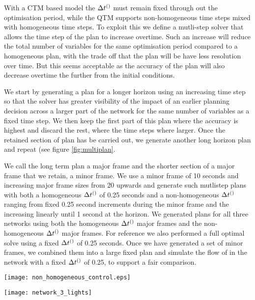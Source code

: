 With a CTM based model the $\DT[]$ must remain fixed through out the
optimisation period, while the QTM supports non-homogeneous time steps
mixed with homogeneous time steps. To exploit this we define a
mutli-step solver that allows the time step of the plan to increase
overtime. Such an increase will reduce the total number of variables
for the same optimisation period compared to a homogeneous plan, with
the trade off that the plan will be have less resolution over
time. But this seems acceptable as the accuracy of the plan will also
decrease overtime the further from the initial conditions.

We start by generating a plan for a longer horizon using an increasing
time step so that the solver has greater visibility of the impact of
an earlier planning decision across a larger part of the network for
the same number of variables as a fixed time step. We then keep the
first part of this plan where the accuracy is highest and discard the
rest, where the time steps where larger. Once the retained section of
plan has be carried out, we generate another long horizon plan and
repeat (see figure \ref{fig:multiplan}.

We call the long term plan a major frame and the shorter section of a
major frame that we retain, a minor frame. We use a minor frame of 10
seconds and increasing major frame sizes from 20 upwards and generate
such mutlistep plans with both a homogeneous $\DT[]$ of 0.25 seconds
and a non-homogeneous $\DT[]$ ranging from fixed 0.25 second increments
during the minor frame and the increasing linearly until 1 second at
the horizon. We generated plans for all three networks using both the
homogeneous $\DT[]$ major frames and the non-homogeneous $\DT[]$ major
frames. For reference we also performed a full optimal solve using a
fixed $\DT[]$ of 0.25 seconds. Once we have generated a set of minor
frames, we combined them into a large fixed plan and simulate the flow
of in the network with a fixed $\DT[]$ of 0.25, to support a fair
comparison.

\begin{figure*}[t!]
\centering
\texttt{[image: non\_homogeneous\_control.eps]}
\caption{Multi-step planning}
\label{fig:multiplan}
\end{figure*}


\begin{figure*}[t!]
\centering
\texttt{[image: network\_3\_lights]}
\caption{Network 1}
\label{fig:network3}
\end{figure*}

